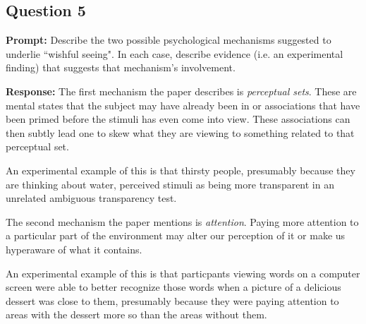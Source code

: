 \documentclass{article}
\begin{document}
\subsection*{Question 5}
\noindent\textbf{Prompt:} Describe the two possible psychological mechanisms suggested to underlie ``wishful seeing". In each case, describe evidence (i.e. an experimental finding) that suggests that mechanism's involvement.
\bigskip

\noindent\textbf{Response:} The first mechanism the paper describes is \textit{perceptual sets}. These are mental states that the subject may have already been in or associations that have been primed before the stimuli has even come into view. These associations can then subtly lead one to skew what they are viewing to something related to that perceptual set.

An experimental example of this is that thirsty people, presumably because they are thinking about water, perceived stimuli as being more transparent in an unrelated ambiguous transparency test.

The second mechanism the paper mentions is \textit{attention}. Paying more attention to a particular part of the environment may alter our perception of it or make us hyperaware of what it contains.

An experimental example of this is that particpants viewing words on a computer screen were able to better recognize those words when a picture of a delicious dessert was close to them, presumably because they were paying attention to areas with the dessert more so than the areas without them.
\end{document}
